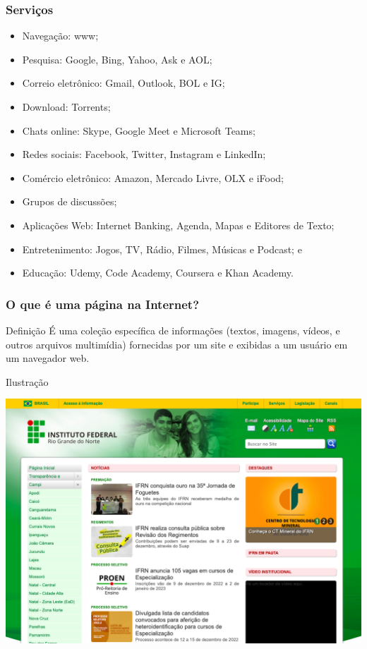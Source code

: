 \documentclass[aspectratio=169]{beamer} %
\begin{document}
\begin{frame}
	\frametitle{Servi\c cos}
			
	\begin{itemize}
		\item Navegação: www;
		\item Pesquisa: Google, Bing, Yahoo, Ask e AOL;	
		\item Correio eletrônico: Gmail, Outlook, BOL e IG;
		\item Download: Torrents;
		\item Chats online: Skype, Google Meet e Microsoft Teams;
		\item Redes sociais: Facebook, Twitter, Instagram e LinkedIn;
		\item Comércio eletrônico: Amazon, Mercado Livre, OLX e iFood;
		\item Grupos de discussões;
		\item Aplicações Web: Internet Banking, Agenda, Mapas e Editores de Texto;
		\item Entretenimento: Jogos, TV, Rádio, Filmes, Músicas e Podcast; e
		\item Educa\c cão: Udemy, Code Academy, Coursera e Khan Academy.
	\end{itemize}
\end{frame}

\begin{frame}
	\frametitle{O que é uma página na Internet?}
	
	\begin{block}{Defini\c cão}
		É uma coleção específica de informações (textos, imagens, vídeos, e outros arquivos multimídia) fornecidas por um site e exibidas a um usuário em um navegador web.
	\end{block} \vfill
			
	\begin{exampleblock}{Ilustra\c cão}
		\begin{center}
			\includegraphics[scale=0.13]{img/pagina}
		\end{center}
	\end{exampleblock}
\end{frame}
\end{document}
